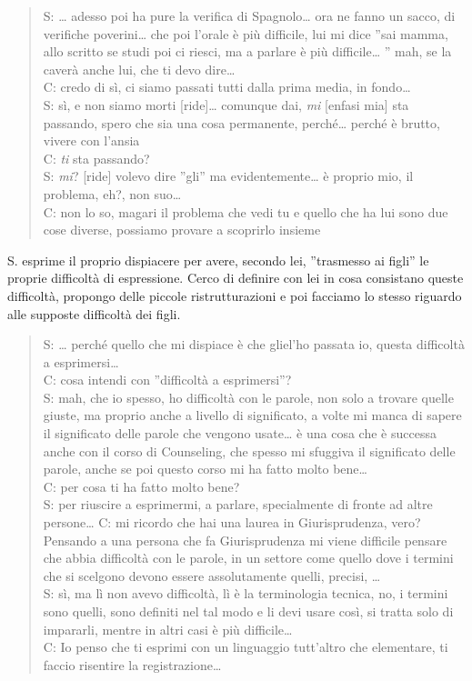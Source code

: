 \begin{verse}
S: \ldots{}   adesso poi ha pure la verifica di Spagnolo\ldots{}   ora ne fanno un sacco, di verifiche poverini\ldots{}   che poi l'orale è più difficile, lui mi dice ''sai mamma, allo scritto se studi poi ci riesci, ma a parlare è più difficile\ldots{}  '' mah, se la caverà anche lui, che ti devo dire\ldots{}  \\
C: credo di sì, ci siamo passati tutti dalla prima media, in fondo\ldots{}  \\
S: sì, e non siamo morti [ride]\ldots{}   comunque dai, \emph{mi} [enfasi mia] sta passando, spero che sia una cosa permanente, perché\ldots{}   perché è brutto, vivere con l'ansia\\
C: \emph{ti} sta passando?\\
S: \emph{mi}? [ride] volevo dire ''gli'' ma evidentemente\ldots{}   è proprio mio, il problema, eh?, non suo\ldots{}  \\
C: non lo so, magari il problema che vedi tu e quello che ha lui sono due cose diverse, possiamo provare a scoprirlo insieme\\
\end{verse}

\noindent S. esprime il proprio dispiacere per avere, secondo lei, ''trasmesso ai figli'' le proprie difficoltà di espressione. Cerco di definire con lei in cosa consistano queste difficoltà, propongo delle piccole ristrutturazioni e poi facciamo lo stesso riguardo alle supposte difficoltà dei figli.

\begin{verse}
S: \ldots{}   perché quello che mi dispiace è che gliel'ho passata io, questa difficoltà a esprimersi\ldots{}  \\
C: cosa intendi con ''difficoltà a esprimersi''?\\
S: mah, che io spesso, ho difficoltà con le parole, non solo a trovare quelle giuste, ma proprio anche a livello di significato, a volte mi manca di sapere il significato delle parole che vengono usate\ldots{}   è una cosa che è successa anche con il corso di Counseling, che spesso mi sfuggiva il significato delle parole, anche se poi questo corso mi ha fatto molto bene\ldots{}  \\
C: per cosa ti ha fatto molto bene?\\
S: per riuscire a esprimermi, a parlare, specialmente di fronte ad altre persone\ldots{}  
C: mi ricordo che hai una laurea in Giurisprudenza, vero? Pensando a una persona che fa Giurisprudenza mi viene difficile pensare che abbia difficoltà con le parole, in un settore come quello dove i termini che si scelgono devono essere assolutamente quelli, precisi, \ldots{}  \\
S: sì, ma lì non avevo difficoltà, lì è la terminologia tecnica, no, i termini sono quelli, sono definiti nel tal modo e li devi usare così, si tratta solo di impararli, mentre in altri casi è più difficile\ldots{}  \\
C: Io penso che ti esprimi con un linguaggio tutt'altro che elementare, ti faccio risentire la registrazione\ldots{}  
\end{verse}

